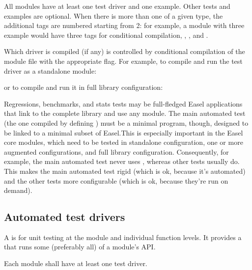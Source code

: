 All modules have at least one test driver and one example. Other tests
and examples are optional. When there is more than one 
of a given type, the additional tags are numbered starting from 2: for
example, a module with three example  would have three
tags for conditional compilation, ,
, and .


Which driver is compiled (if any) is controlled by conditional
compilation of the module  file with the appropriate
flag. For example, to compile and run the  test driver as
a standalone module:

\begin{cchunk}
\end{cchunk}

or to compile and run it in full library configuration:

\begin{cchunk}
\end{cchunk}

Regressions, benchmarks, and stats tests may be full-fledged Easel
applications that link to the complete library and use any module.
The main automated test (the one compiled by defining ) must be a minimal program, though, designed to be
linked to a minimal subset of Easel.This is especially important in
the Easel core modules, which need to be tested in standalone
configuration, one or more augmented configurations, and full library
configuration. Consequently, for example, the main automated test
never uses , whereas other tests usually do. This makes
the main automated test rigid (which is ok, because it's automated)
and the other tests more configurable (which is ok, because they're
run on demand). 

\subsection{Automated test drivers}

A  is for unit testing at the module and
individual function levels. It provides a  that runs
some (preferably all) of a module's API.

Each module shall have at least one test driver.

